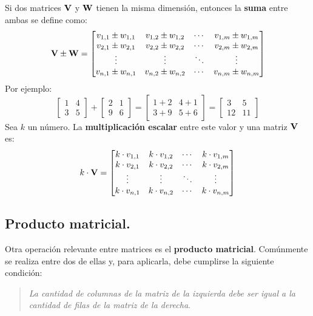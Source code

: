 \documentclass[12pt]{article}
\begin{document}
Si dos matrices $\mathbf{V}$ y $\mathbf{W}$ tienen la misma dimensión, entonces la \textbf{suma} entre ambas se define como:
\[
\mathbf{V} \pm \mathbf{W} =
\begin{bmatrix}
v_{1, 1} \pm w_{1, 1} & v_{1, 2} \pm w_{1, 2} & \cdots & v_{1, m} \pm w_{1, m} \\
v_{2, 1} \pm w_{2, 1} & v_{2, 2} \pm w_{2, 2} & \cdots & v_{2, m} \pm w_{2, m} \\
\vdots & \vdots & \ddots & \vdots \\
v_{n, 1} \pm w_{n, 1} & v_{n, 2} \pm w_{n, 2} & \cdots & v_{n, m} \pm w_{n, m}
\end{bmatrix}
\]
Por ejemplo:
\[
\begin{bmatrix}
1 & 4 \\
3 & 5
\end{bmatrix} +
\begin{bmatrix}
2 & 1 \\
9 & 6
\end{bmatrix} =
\begin{bmatrix}
1 + 2 & 4 + 1 \\
3 + 9 & 5 + 6
\end{bmatrix} =
\begin{bmatrix}
3 & 5 \\
12 & 11
\end{bmatrix}
\]
Sea $k$ un número. La \textbf{multiplicación escalar} entre este valor y una matriz $\mathbf{V}$ es:
\[
k \cdot \mathbf{V} =
\begin{bmatrix}
k \cdot v_{1,1} & k \cdot v_{1, 2} & \cdots & k \cdot v_{1, m} \\
k \cdot v_{2,1} & k \cdot v_{2, 2} & \cdots & k \cdot v_{2, m} \\
\vdots & \vdots & \ddots & \vdots \\
k \cdot v_{n, 1} & k \cdot v_{n, 2} & \cdots & k \cdot v_{n, m}
\end{bmatrix}
\]

\subsection{Producto matricial.}

Otra operación relevante entre matrices es el \textbf{producto matricial}. Comúnmente se realiza entre dos de ellas y, para aplicarla, debe cumplirse la siguiente condición:

\begin{quote}
\centering
\textit{La cantidad de columnas de la matriz de la izquierda debe ser igual a la cantidad de filas de la matriz de la derecha}.
\end{quote}
\end{document}
